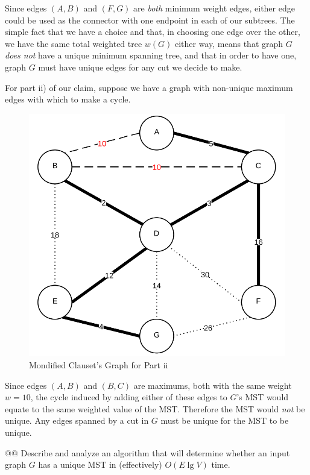\documentclass[10pt]{article}\usepackage[]{graphicx}\usepackage[]{xcolor}
\begin{document}
\begin{easylist}[enumerate]
    Since edges $(A, B)$ and $(F, G)$ are \textit{both} minimum weight edges, either edge could be used as the connector
    with one endpoint in each of our subtrees. The simple fact that we have a choice and that, in choosing one edge over
    the other, we have the same total weighted tree $w(G)$ either way, means that graph $G$ \textit{does not} have a
    unique minimum spanning tree, and that in order to have one, graph $G$ must have unique edges for any cut we decide
    to make.\newline

    For part ii) of our claim, suppose we have a graph with non-unique maximum edges with which to make a cycle.

    \begin{figure}[H]
        \centering
        \includegraphics[scale=0.5]{./img/ps8/3cc.png}
        \caption{Mondified Clauset's Graph for Part ii}
        \label{fig:3bb}
    \end{figure}

    Since edges $(A, B)$ and $(B, C)$ are maximums, both with the same weight $w=10$, the cycle induced by adding either
    of these edges to $G$'s MST would equate to the same weighted value of the MST. Therefore the MST would \textit{not}
    be unique. Any edges spanned by a cut in $G$ must be unique for the MST to be unique.

    @@ Describe and analyze an algorithm that will determine whether an input graph $G$ has a unique MST in
    (effectively) $O(E \lg V)$ time.


\end{easylist}
\end{document}
